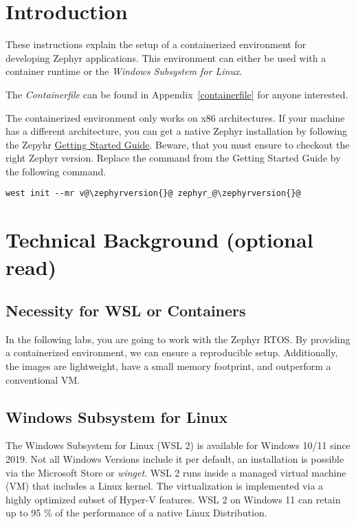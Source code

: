 



\puttitle{}

\section{Introduction}

These instructions explain the setup of a containerized environment for developing Zephyr applications.
This environment can either be used with a container runtime or the \emph{Windows Subsystem for Linux}.

The \emph{Containerfile} can be found in Appendix~\ref{containerfile} for anyone interested.

The containerized environment only works on x86 architectures.
If your machine has a different architecture, you can get a native Zephyr installation by following the Zepyhr \href{https://docs.zephyrproject.org/\zephyrversion/develop/getting_started/index.html}{Getting Started Guide}.
Beware, that you must ensure to checkout the right Zephyr version. Replace the  command from the Getting Started Guide by the following command.

\begin{lstlisting}
west init --mr v@\zephyrversion{}@ zephyr_@\zephyrversion{}@
\end{lstlisting}

\section{Technical Background (optional read)}

\subsection{Necessity for WSL or Containers}

In the following labs, you are going to work with the Zephyr RTOS.
By providing a containerized environment, we can ensure a reproducible setup.
Additionally, the images are lightweight, have a small memory footprint, and outperform a conventional VM.

\subsection{Windows Subsystem for Linux}

The Windows Subsystem for Linux (WSL 2) is available for Windows 10/11 since 2019.
Not all Windows Versions include it per default, an installation is possible via the Microsoft Store or \emph{winget}.
WSL 2 runs inside a managed virtual machine (VM) that includes a Linux kernel.
The virtualization is implemented via a highly optimized subset of Hyper-V features.
WSL 2 on Windows 11 can retain up to 95 \% of the performance of a native Linux Distribution.

